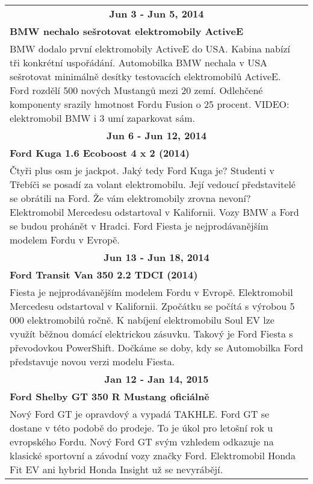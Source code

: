 \begin{tabularx}{\linewidth}{l l}
                \multicolumn{2}{c}{\bf Jun 3 - Jun 5, 2014} \\
                \multicolumn{2}{p{\linewidth}}{\bf BMW nechalo sešrotovat elektromobily ActiveE} \\
                \multicolumn{2}{p{\linewidth}}{BMW dodalo první elektromobily ActiveE do USA. Kabina nabízí tři konkrétní uspořádání. Automobilka BMW nechala v USA sešrotovat minimálně desítky testovacích elektromobilů ActiveE. Ford rozdělí 500 nových Mustangů mezi 20 zemí. Odlehčené komponenty srazily hmotnost Fordu Fusion o 25 procent. VIDEO: elektromobil BMW i 3 umí zaparkovat sám.} \\ \midrule
                
                \multicolumn{2}{c}{\bf Jun 6 - Jun 12, 2014} \\
                \multicolumn{2}{p{\linewidth}}{\bf Ford Kuga 1.6 Ecoboost 4 x 2 (2014)} \\
                \multicolumn{2}{p{\linewidth}}{Čtyři plus osm je jackpot. Jaký tedy Ford Kuga je? Studenti v Třebíči se posadí za volant elektromobilu. Její vedoucí představitelé se obrátili na Ford. Že vám elektromobily zrovna nevoní? Elektromobil Mercedesu odstartoval v Kalifornii. Vozy BMW a Ford se budou prohánět v Hradci. Ford Fiesta je nejprodávanějším modelem Fordu v Evropě.} \\ \midrule
                
                \multicolumn{2}{c}{\bf Jun 13 - Jun 18, 2014} \\
                \multicolumn{2}{p{\linewidth}}{\bf Ford Transit Van 350 2.2 TDCI (2014)} \\
                \multicolumn{2}{p{\linewidth}}{Fiesta je nejprodávanějším modelem Fordu v Evropě. Elektromobil Mercedesu odstartoval v Kalifornii. Zpočátku se počítá s výrobou 5 000 elektromobilů ročně. K nabíjení elektromobilu Soul EV lze využít běžnou domácí elektrickou zásuvku. Takový je Ford Fiesta s převodovkou PowerShift. Dočkáme se doby, kdy se Automobilka Ford představuje novou verzi modelu Fiesta.} \\ \midrule
                
                \multicolumn{2}{c}{\bf Jan 12 - Jan 14, 2015} \\
                \multicolumn{2}{p{\linewidth}}{\bf Ford Shelby GT 350 R Mustang oficiálně} \\
                \multicolumn{2}{p{\linewidth}}{Nový Ford GT je opravdový a vypadá TAKHLE. Ford GT se dostane v této podobě do prodeje. To je úkol pro letošní rok u evropského Fordu. Nový Ford GT svým vzhledem odkazuje na klasické sportovní a závodní vozy značky Ford. Elektromobil Honda Fit EV ani hybrid Honda Insight už se nevyrábějí.} \\ \midrule
                [1.5pt]


\end{tabularx}
